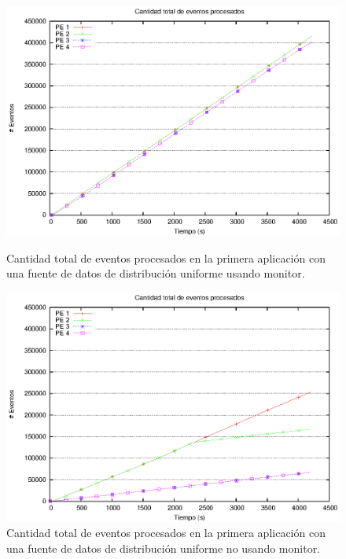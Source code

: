 \begin{figure}[ht]
\centering

\begin{minipage}[c]{0.45\textwidth}
\centering
    \includegraphics[width=\textwidth]{images/exp/app1/uniform/cm/eventCount.eps}
    \caption{Cantidad total de eventos procesados en la primera aplicación con una fuente de datos de distribución uniforme usando monitor.}
    \label{fig:app1-uniform-eventCount-cm}
\end{minipage} \hspace*{1cm}
\begin{minipage}[c]{0.45\textwidth}
\centering
    \includegraphics[width=\textwidth]{images/exp/app1/uniform/sm/eventCount.eps}
    \caption{Cantidad total de eventos procesados en la primera aplicación con una fuente de datos de distribución uniforme no usando monitor.}
    \label{fig:app1-uniform-eventCount-sm}
\end{minipage}

\end{figure}

